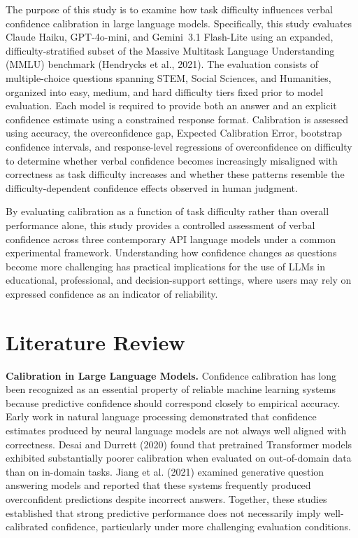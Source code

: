 \documentclass[twoside,twocolumn,10pt]{article}
\begin{document}
The purpose of this study is to examine how task difficulty influences verbal confidence calibration in large language models. Specifically, this study evaluates Claude Haiku, GPT-4o-mini, and Gemini~3.1 Flash-Lite using an expanded, difficulty-stratified subset of the Massive Multitask Language Understanding (MMLU) benchmark (Hendrycks et al., 2021). The evaluation consists of multiple-choice questions spanning STEM, Social Sciences, and Humanities, organized into easy, medium, and hard difficulty tiers fixed prior to model evaluation. Each model is required to provide both an answer and an explicit confidence estimate using a constrained response format. Calibration is assessed using accuracy, the overconfidence gap, Expected Calibration Error, bootstrap confidence intervals, and response-level regressions of overconfidence on difficulty to determine whether verbal confidence becomes increasingly misaligned with correctness as task difficulty increases and whether these patterns resemble the difficulty-dependent confidence effects observed in human judgment.

By evaluating calibration as a function of task difficulty rather than overall performance alone, this study provides a controlled assessment of verbal confidence across three contemporary API language models under a common experimental framework. Understanding how confidence changes as questions become more challenging has practical implications for the use of LLMs in educational, professional, and decision-support settings, where users may rely on expressed confidence as an indicator of reliability.

\section{Literature Review}

\fontsize{12}{14}\selectfont

\textbf{Calibration in Large Language Models.}
Confidence calibration has long been recognized as an essential property of reliable machine learning systems because predictive confidence should correspond closely to empirical accuracy. Early work in natural language processing demonstrated that confidence estimates produced by neural language models are not always well aligned with correctness. Desai and Durrett (2020) found that pretrained Transformer models exhibited substantially poorer calibration when evaluated on out-of-domain data than on in-domain tasks. Jiang et al. (2021) examined generative question answering models and reported that these systems frequently produced overconfident predictions despite incorrect answers. Together, these studies established that strong predictive performance does not necessarily imply well-calibrated confidence, particularly under more challenging evaluation conditions.
\end{document}
